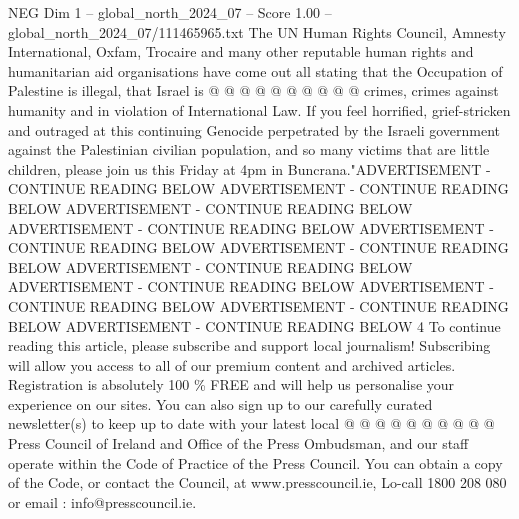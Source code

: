 \begin{textsample}{NEG Dim 1 – global\_north\_2024\_07 – Score 1.00 – global\_north\_2024\_07/111465965.txt}
The UN Human Rights Council, Amnesty International, Oxfam, Trocaire and many other reputable human rights and humanitarian aid organisations have come out all stating that the Occupation of Palestine is illegal, that Israel is @ @ @ @ @ @ @ @ @ @ crimes, crimes against humanity and in violation of International Law.
If you feel horrified, grief-stricken and outraged at this continuing Genocide perpetrated by the Israeli government against the Palestinian civilian population, and so many victims that are little children, please join us this Friday at 4pm in Buncrana."ADVERTISEMENT - CONTINUE READING BELOW ADVERTISEMENT - CONTINUE READING BELOW ADVERTISEMENT - CONTINUE READING BELOW ADVERTISEMENT - CONTINUE READING BELOW ADVERTISEMENT - CONTINUE READING BELOW ADVERTISEMENT - CONTINUE READING BELOW ADVERTISEMENT - CONTINUE READING BELOW ADVERTISEMENT - CONTINUE READING BELOW ADVERTISEMENT - CONTINUE READING BELOW ADVERTISEMENT - CONTINUE READING BELOW ADVERTISEMENT - CONTINUE READING BELOW 4 To continue reading this article, please subscribe and support local journalism!
Subscribing will allow you access to all of our premium content and archived articles.
Registration is absolutely 100 \% FREE and will help us personalise your experience on our sites.
You can also sign up to our carefully curated newsletter(s) to keep up to date with your latest local @ @ @ @ @ @ @ @ @ @ Press Council of Ireland and Office of the Press Ombudsman, and our staff operate within the Code of Practice of the Press Council.
You can obtain a copy of the Code, or contact the Council, at www.presscouncil.ie, Lo-call 1800 208 080 or email : info@presscouncil.ie.

\end{textsample}

